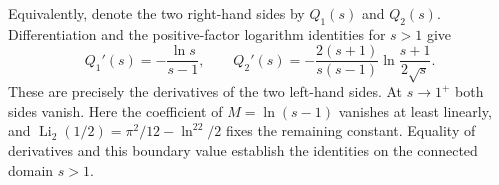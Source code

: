 Equivalently, denote the two right-hand sides by $Q_1(s)$ and $Q_2(s)$. Differentiation and the positive-factor logarithm identities for $s>1$ give
\begin{equation}
 Q_1'(s)=-\frac{\ln s}{s-1},\qquad
 Q_2'(s)=-\frac{2(s+1)}{s(s-1)}\ln\frac{s+1}{2\sqrt s}.
\end{equation}
These are precisely the derivatives of the two left-hand sides. At $s\to1^+$ both sides vanish. Here the coefficient of $M=\ln(s-1)$ vanishes at least linearly, and $\operatorname{Li}_2(1/2)=\pi^2/12-\ln^22/2$ fixes the remaining constant. Equality of derivatives and this boundary value establish the identities on the connected domain $s>1$.
